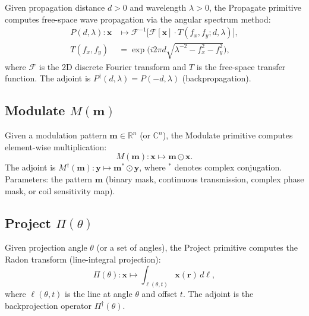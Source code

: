 \documentclass[11pt]{article}
\begin{document}
\begin{definition}[Propagate]
\label{def:propagate}
Given propagation distance $d > 0$ and wavelength $\lambda > 0$, the Propagate primitive computes free-space wave propagation via the angular spectrum method:
\begin{align}
  P(d,\lambda): \mathbf{x} &\mapsto \mathcal{F}^{-1}\bigl[\mathcal{F}[\mathbf{x}] \cdot T(f_x, f_y; d, \lambda)\bigr], \\
  T(f_x, f_y) &= \exp\!\bigl(i 2\pi d \sqrt{\lambda^{-2} - f_x^2 - f_y^2}\bigr),
\end{align}
where $\mathcal{F}$ is the 2D discrete Fourier transform and $T$ is the free-space transfer function. The adjoint is $P^\dagger(d,\lambda) = P(-d, \lambda)$ (backpropagation).
\end{definition}

\subsection{Modulate \texorpdfstring{$M(\mathbf{m})$}{M(m)}}

\begin{definition}[Modulate]
\label{def:modulate}
Given a modulation pattern $\mathbf{m} \in \mathbb{R}^n$ (or $\mathbb{C}^n$), the Modulate primitive computes element-wise multiplication:
\begin{equation}
  M(\mathbf{m}): \mathbf{x} \mapsto \mathbf{m} \odot \mathbf{x}.
\end{equation}
The adjoint is $M^\dagger(\mathbf{m}): \mathbf{y} \mapsto \mathbf{m}^* \odot \mathbf{y}$, where $^*$ denotes complex conjugation. Parameters: the pattern $\mathbf{m}$ (binary mask, continuous transmission, complex phase mask, or coil sensitivity map).
\end{definition}

\subsection{Project \texorpdfstring{$\Pi(\theta)$}{Pi(theta)}}

\begin{definition}[Project]
\label{def:project}
Given projection angle $\theta$ (or a set of angles), the Project primitive computes the Radon transform (line-integral projection):
\begin{equation}
  \Pi(\theta): \mathbf{x} \mapsto \int_{\ell(\theta, t)} \mathbf{x}(\mathbf{r})\, d\ell,
\end{equation}
where $\ell(\theta, t)$ is the line at angle $\theta$ and offset $t$. The adjoint is the backprojection operator $\Pi^\dagger(\theta)$.
\end{definition}
\end{document}

